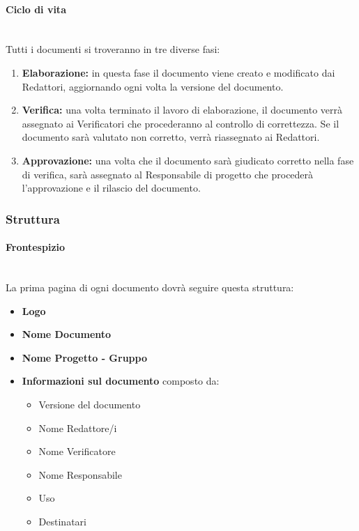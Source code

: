 \documentclass[11pt,a4paper]{article}
\begin{document}
	\paragraph{Ciclo di vita}
		\noindent \\Tutti i documenti si troveranno in tre diverse fasi:
	\begin{enumerate}
	\item \textbf{Elaborazione:} in questa fase il documento viene creato e modificato dai Redattori, aggiornando ogni volta la versione del documento. 
	\item \textbf{Verifica:} una volta terminato il lavoro di elaborazione, il documento verrà assegnato ai Verificatori che procederanno al controllo di correttezza. Se il documento sarà valutato non corretto, verrà riassegnato ai Redattori.
	\item \textbf{Approvazione:} una volta che il documento sarà giudicato corretto nella fase di verifica, sarà assegnato al Responsabile di progetto che procederà l'approvazione e il rilascio del documento.
	\end{enumerate}
	
	\subsubsection{Struttura}
	
	\paragraph{Frontespizio} 
	\noindent \\La prima pagina di ogni documento dovrà seguire questa struttura:
	\begin{itemize}
	\item \textbf{Logo}
	\item \textbf{Nome Documento}
	\item \textbf{Nome Progetto - Gruppo}
	\item \textbf{Informazioni sul documento} composto da:
	\begin{itemize}
		\item  Versione del documento 
		\item Nome Redattore/i
		\item Nome Verificatore
		\item  Nome Responsabile
		\item  Uso
		\item Destinatari
	\end{itemize}
	\end{itemize}
\end{document}
